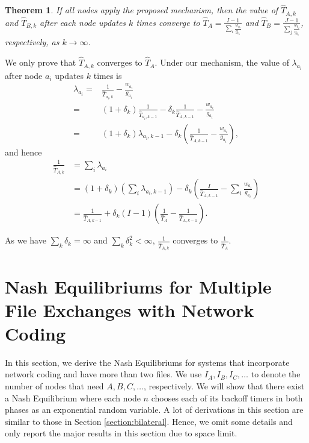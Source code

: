 \documentclass[11pt, conference]{IEEEtran}
\newtheorem{theorem}{Theorem}
\begin{document}
\begin{theorem} \label{theorem:distributed:convergence}
If all nodes apply the proposed mechanism, then the value of $\hat{T}_{A,k}$ and $\hat{T}_{B,k}$ after each node updates $k$ times converge to $\hat{T}_A=\frac{I-1}{\sum_i\frac{w_{a_i}}{g_{a_i}}}$ and $\hat{T}_B=\frac{J-1}{\sum_j\frac{w_{b_j}}{g_{b_j}}}$, respectively, as $k\rightarrow\infty$.
\end{theorem}
\begin{IEEEproof}
We only prove that $\hat{T}_{A,k}$ converges to $\hat{T}_{A}$. Under our mechanism, the value of $\lambda_{a_i}$ after node $a_i$ updates $k$ times is
\begin{align*}
\lambda_{a_i}=&\frac{1}{\hat{T}_{a_i,k}}-\frac{w_{a_i}}{g_{a_i}}\\
=&(1+\delta_k)\frac{1}{\hat{T}_{a_i,k-1}}-\delta_k\frac{1}{\hat{T}_{A,k-1}}-\frac{w_{a_i}}{g_{a_i}}\\
=&(1+\delta_k)\lambda_{a_i,k-1}-\delta_k(\frac{1}{\hat{T}_{A,k-1}}-\frac{w_{a_i}}{g_{a_i}}),
\end{align*}
and hence
\begin{align*}
\frac{1}{\hat{T}_{A,k}}&=\sum_i\lambda_{a_i}\\
&=(1+\delta_k)(\sum_i\lambda_{a_i,k-1})-\delta_k(\frac{I}{\hat{T}_{A,k-1}}-\sum_i\frac{w_{a_i}}{g_{a_i}})\\
&=\frac{1}{\hat{T}_{A,k-1}}+\delta_k(I-1)(\frac{1}{\hat{T}_A}-\frac{1}{\hat{T}_{A,k-1}}).
\end{align*}

As we have $\sum_k\delta_k=\infty$ and $\sum_k\delta_k^2<\infty$, $\frac{1}{\hat{T}_{A,k}}$ converges to $\frac{1}{\hat{T}_A}$.
\end{IEEEproof}

\section{Nash Equilibriums for Multiple File Exchanges with Network Coding} \label{section:network coding}

In this section, we derive the Nash Equilibriums for systems that incorporate network coding and have more than two files. We use $I_A, I_B,I_C,\dots$ to denote the number of nodes that need $A,B,C,\dots$, respectively. We will show that there exist a Nash Equilibrium  where each node $n$ chooses each of its backoff timers in both phases as an exponential random variable. A lot of derivations in this section are similar to those in Section \ref{section:bilateral}. Hence, we omit some details and only report the major results in this section due to space limit.
\end{document}
